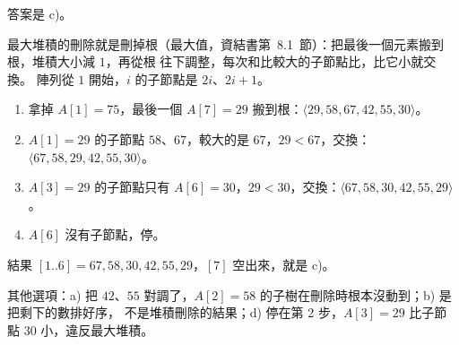 \begin{pastsoln}
答案是 c)。

最大堆積的刪除就是刪掉根（最大值，資結書第~8.1~節）：把最後一個元素搬到根，堆積大小減 $1$，再從根
往下調整，每次和比較大的子節點比，比它小就交換。 陣列從 $1$ 開始，$i$ 的子節點是 $2i$、$2i + 1$。
\begin{enumerate}
\item 拿掉 $A[1] = 75$，最後一個 $A[7] = 29$ 搬到根：$\langle 29, 58, 67, 42, 55, 30 \rangle$。
\item $A[1] = 29$ 的子節點 $58$、$67$，較大的是 $67$，$29 < 67$，交換：
$\langle 67, 58, 29, 42, 55, 30 \rangle$。
\item $A[3] = 29$ 的子節點只有 $A[6] = 30$，$29 < 30$，交換：$\langle 67, 58, 30, 42, 55, 29 \rangle$。
\item $A[6]$ 沒有子節點，停。
\end{enumerate}
結果 $[1..6] = 67, 58, 30, 42, 55, 29$，$[7]$ 空出來，就是 c)。

其他選項：a) 把 $42$、$55$ 對調了，$A[2] = 58$ 的子樹在刪除時根本沒動到；b) 是把剩下的數排好序，
不是堆積刪除的結果；d) 停在第 2 步，$A[3] = 29$ 比子節點 $30$ 小，違反最大堆積。
\end{pastsoln}
